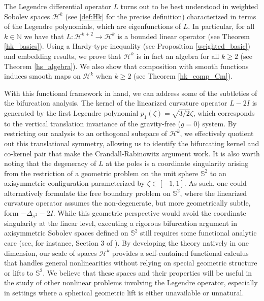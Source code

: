 \documentclass[11pt,reqno]{amsart}
\numberwithin{equation}{section}
\def\h{\mathcal{H}}
\begin{document}
The Legendre differential operator $L$ turns out to be best understood in weighted Sobolev spaces $\h^k$ (see \eqref{def:Hk} for the precise definition) characterized in terms of the Legendre polynomials, which are eigenfunctions of $L$.  In particular, for all $k\in \mathbb N$ we have that $ L:\h^{k+2}\to \h^k$  is a bounded linear operator (see Theorem \ref{hk_basics}).  Using a Hardy-type inequality (see Proposition \ref{weighted_basic}) and embedding results, we prove that $\h^k$ is in fact an algebra for all $k\ge 2$ (see Theorem \ref{hs_algebra}). We also show that composition with smooth functions induces smooth maps on $\h^k$ when $k\ge 2$ (see Theorem \ref{hk_comp_Cm}).  

With this functional framework in hand, we can address some of the subtleties of the bifurcation analysis.  The kernel of the linearized curvature operator $L-2I$ is generated by the first Legendre polynomial $p_1(\zeta) =\sqrt{3/2}  \zeta$, which corresponds to the vertical translation invariance of the gravity-free ($g=0$) system.  By restricting our analysis to an orthogonal subspace of $\h^k$, we effectively quotient out this translational symmetry, allowing us to identify the bifurcating kernel and co-kernel pair that make the Crandall-Rabinowitz argument work.  It is also worth noting that the degeneracy of $L$ at the poles is a coordinate singularity arising from the restriction of a geometric problem on the unit sphere $\mathbb{S}^2$ to an axisymmetric configuration parameterized by $\zeta \in [-1,1]$.  As such, one could alternatively formulate the free boundary problem on $\mathbb{S}^2$, where the linearized curvature operator assumes the non-degenerate, but more geometrically subtle, form $-\Delta_{\mathbb{S}^2} - 2I$.  While this geometric perspective would avoid the coordinate singularity at the linear level, executing a rigorous bifurcation argument in axisymmetric Sobolev spaces defined on $\mathbb{S}^2$ still requires some functional analytic care (see, for instance, Section 3 of \cite{MNS_2025}).  By developing the theory natively in one dimension, our scale of spaces $\h^k$ provides a self-contained functional calculus that handles general nonlinearities without relying on special geometric structure or lifts to $\mathbb{S}^2$. We believe that these spaces and their properties will be useful in the study of other nonlinear problems involving the Legendre operator, especially in settings where a spherical geometric lift is either unavailable or unnatural.
\end{document}
